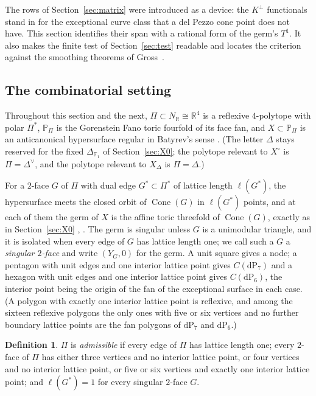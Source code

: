 \documentclass[11pt]{amsart}
\theoremstyle{definition}
\newtheorem{definition}[theorem]{Definition}
\theoremstyle{remark}
\theoremstyle{plain}
\newcommand{\RR}{\mathbb{R}}
\newcommand{\PP}{\mathbb{P}}
\newcommand{\Cone}{\operatorname{Cone}}
\newcommand{\dP}{\mathrm{dP}}
\begin{document}
The rows of Section~\ref{sec:matrix} were introduced as a device: the
$K^{\perp}$ functionals stand in for the exceptional curve class that a
del Pezzo cone point does not have.  This section identifies their span with a
rational form of the germ's $T^1$.  It also makes
the finite test of Section~\ref{sec:test} readable and locates the criterion
against the smoothing theorems of Gross~\cite{Gross97}.

\subsection{The combinatorial setting}\label{sec:combsetting}
Throughout this section and the next, $\Pi\subset N_{\RR}\cong\RR^4$ is a
reflexive $4$-polytope with polar $\Pi^{*}$, $\PP_{\Pi}$ is the Gorenstein
Fano toric fourfold of its face fan, and $X\subset\PP_{\Pi}$ is an
anticanonical hypersurface regular in Batyrev's sense
\cite[Definition~3.1.1]{Batyrev94}.  (The letter $\Delta$ stays reserved
for the fixed $\Delta_{\mathbb F_1}$ of Section~\ref{sec:X0}; the
polytope relevant to $X^{\circ}$ is $\Pi=\Delta^{\vee}$, and the
polytope relevant to $X_{\Delta}$ is $\Pi=\Delta$.)

For a $2$-face $G$ of $\Pi$ with dual edge $G^{*}\subset\Pi^{*}$ of
lattice length $\ell(G^{*})$, the hypersurface meets the closed orbit
of $\Cone(G)$ in $\ell(G^{*})$ points, and at each of them the germ of
$X$ is the affine toric threefold of $\Cone(G)$, exactly as in
Section~\ref{sec:X0} \cite{Batyrev94}, \cite[Proposition~3.1]{PaperI}.  The
germ is singular
unless $G$ is a unimodular triangle, and it is isolated when every edge
of $G$ has lattice length one; we call such a $G$ a \emph{singular
$2$-face} and write $(Y_G,0)$ for the germ.  A unit square gives a node;
a pentagon with unit edges and one interior lattice point gives $C(\dP_7)$
and a hexagon with unit edges and one interior lattice point gives
$C(\dP_6)$, the interior point
being the origin of the fan of the exceptional surface in each case.
(A polygon with exactly one interior lattice point is reflexive, and among
the sixteen reflexive polygons the only ones with five or six vertices and no
further boundary lattice points are the fan polygons of $\dP_7$ and $\dP_6$.)

\begin{definition}\label{def:admissible}
$\Pi$ is \emph{admissible} if every edge of $\Pi$ has lattice length
one; every $2$-face of $\Pi$ has either three vertices and no interior
lattice point, or four vertices and no interior lattice point, or five or
six vertices and exactly one interior lattice point; and $\ell(G^{*})=1$
for every singular $2$-face $G$.
\end{definition}
\end{document}

